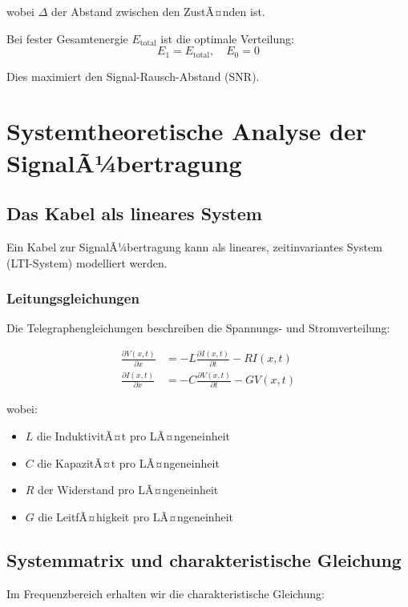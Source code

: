 ﻿\documentclass[12pt,a4paper]{article}
\theoremstyle{definition}
\theoremstyle{remark}
\begin{document}
wobei $\Delta$ der Abstand zwischen den ZustÃ¤nden ist.

Bei fester Gesamtenergie $E_{\text{total}}$ ist die optimale Verteilung:
\begin{equation}
E_1 = E_{\text{total}}, \quad E_0 = 0
\end{equation}

Dies maximiert den Signal-Rausch-Abstand (SNR).

\section{Systemtheoretische Analyse der SignalÃ¼bertragung}

\subsection{Das Kabel als lineares System}

Ein Kabel zur SignalÃ¼bertragung kann als lineares, zeitinvariantes System (LTI-System) modelliert werden.

\subsubsection{Leitungsgleichungen}

Die Telegraphengleichungen beschreiben die Spannungs- und Stromverteilung:

\begin{align}
\frac{\partial V(x,t)}{\partial x} &= -L \frac{\partial I(x,t)}{\partial t} - R I(x,t) \\
\frac{\partial I(x,t)}{\partial x} &= -C \frac{\partial V(x,t)}{\partial t} - G V(x,t)
\end{align}

wobei:
\begin{itemize}
\item $L$ die InduktivitÃ¤t pro LÃ¤ngeneinheit
\item $C$ die KapazitÃ¤t pro LÃ¤ngeneinheit
\item $R$ der Widerstand pro LÃ¤ngeneinheit
\item $G$ die LeitfÃ¤higkeit pro LÃ¤ngeneinheit
\end{itemize}

\subsection{Systemmatrix und charakteristische Gleichung}

Im Frequenzbereich erhalten wir die charakteristische Gleichung:
\end{document}
